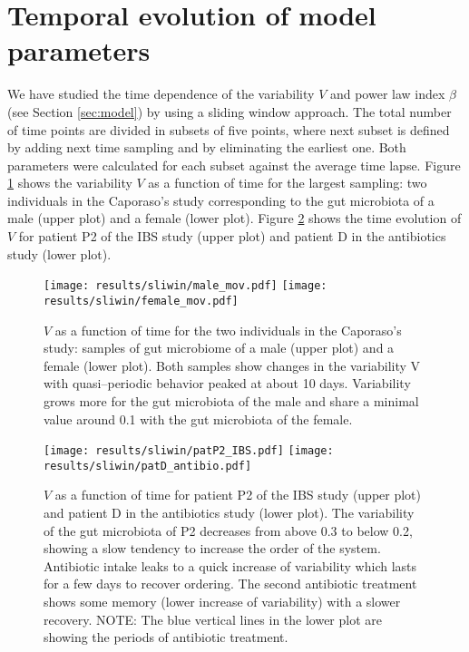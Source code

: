 \documentclass[12pt]{article}
\begin{document}
\section{Temporal evolution of model parameters}

We have studied the time dependence of the variability $V$ and power law index $\beta$ (see Section \ref{sec:model}) by using a sliding window approach. The total number of time points are divided in subsets of five points, where next subset is defined by adding next time sampling and by eliminating the earliest one. Both parameters were calculated for each subset against the average time lapse. Figure \ref{fig:tempevo1} shows the variability  $V$ as a function of time for the largest sampling: two individuals in the Caporaso's study\cite{moving} corresponding to the gut microbiota of a male (upper plot) and a female (lower plot). Figure \ref{fig:tempevo2} shows the time evolution of $V$ for patient P2 of the IBS study\cite{IBS} (upper plot) and patient D in the antibiotics study\cite{antibiotic} (lower plot). 

\begin{figure}
	\texttt{[image: results/sliwin/male\_mov.pdf]}
	\hspace*{3mm}\texttt{[image: results/sliwin/female\_mov.pdf]}
\caption{$V$ as a function of time for the two individuals in the Caporaso's study\cite{moving}: samples of gut microbiome of a male (upper plot) and a female (lower plot). Both samples show changes in the variability V with quasi--periodic behavior peaked at about 10 days. Variability grows more for the gut microbiota of the male and share a minimal value around 0.1 with the gut microbiota of the female.}
\label{fig:tempevo1}
\end{figure}

\begin{figure}
	\centering 
 	\texttt{[image: results/sliwin/patP2\_IBS.pdf]}
  	\texttt{[image: results/sliwin/patD\_antibio.pdf]} 
\caption{$V$ as a function of time for patient P2 of the IBS study\cite{IBS} (upper plot) and patient D in the antibiotics study\cite{antibiotic} (lower plot). The variability 
of the gut microbiota of P2 decreases from above 0.3 to below 0.2, showing a slow tendency to increase the order of the system.  Antibiotic intake leaks to a quick increase of variability which lasts for a few days to recover ordering. The second antibiotic treatment shows some memory (lower increase of variability) with a slower recovery. NOTE: The blue vertical lines in the lower plot are showing the periods of antibiotic treatment.}
\label{fig:tempevo2}
\end{figure}
\end{document}
